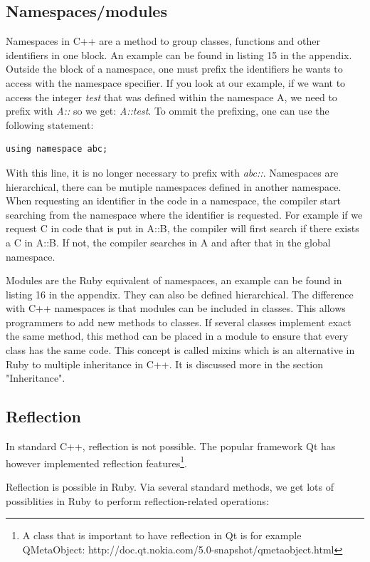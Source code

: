 \documentclass[10pt,a4paper,twocolumn]{article}
\begin{document}
\subsection{Namespaces/modules}
Namespaces in C++ are a method to group classes, functions and other identifiers in one block. An example can be found in listing 15 in the appendix. Outside the block of a namespace, one must prefix the identifiers he wants to access with the namespace specifier. If you look at our example, if we want to access the integer \textit{test} that was defined within the namespace A, we need to prefix with \textit{A::} so we get: \textit{A::test}. To ommit the prefixing, one can use the following statement:

\begin{lstlisting}
using namespace abc;
\end{lstlisting}

With this line, it is no longer necessary to prefix with \textit{abc::}. Namespaces are hierarchical, there can be mutiple namespaces defined in another namespace. When requesting an identifier in the code in a namespace, the compiler start searching from the namespace where the identifier is requested. For example if we request C in code that is put in A::B, the compiler will first search if there exists a C in A::B. If not, the compiler searches in A and after that in the global namespace.

Modules are the Ruby equivalent of namespaces, an example can be found in listing 16 in the appendix. They can also be defined hierarchical. The difference with C++ namespaces is that modules can be included in classes. This allows programmers to add new methods to classes. If several classes implement exact the same method, this method can be placed in a module to ensure that every class has the same code. This concept is called mixins which is an alternative in Ruby to multiple inheritance in C++. It is discussed more in the section "Inheritance".

\subsection{Reflection}
In standard C++, reflection is not possible. The popular framework Qt has however implemented reflection features\footnote{A class that is important to have reflection in Qt is for example QMetaObject: http://doc.qt.nokia.com/5.0-snapshot/qmetaobject.html}.

Reflection is possible in Ruby. Via several standard methods, we get lots of possiblities in Ruby to perform reflection-related operations:
\end{document}
